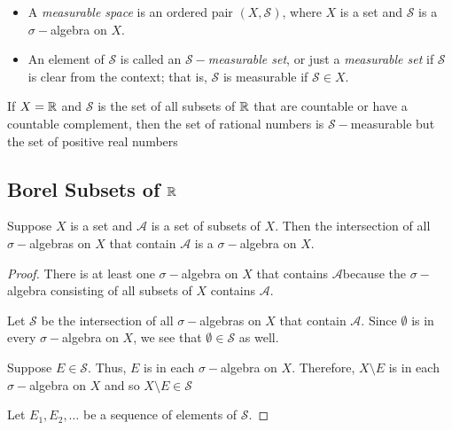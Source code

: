 \documentclass[11pt,a4paper]{book}
\begin{document}
\begin{definition}
    \begin{itemize}
        \item A \textit{measurable space} is an ordered pair \( (X, \mathcal{S}) \), where \( X  \) is a set and \( \mathcal{S} \) is a \( \sigma- \)algebra on \( X  \).
        \item An element of \( \mathcal{S} \) is called an \textit{ \( \mathcal{S}- \)measurable set}, or just a \textit{measurable set} if \( \mathcal{S} \) is clear from the context; that is, \( \mathcal{S}  \) is measurable if \( \mathcal{S} \in X   \).
    \end{itemize}
\end{definition}

\begin{eg}
  If \( X = \mathbb{R}  \) and \( \mathcal{S} \) is the set of all subsets of \( \mathbb{R}  \) that are countable or have a countable complement, then the set of rational numbers is \( \mathcal{S}- \)measurable but the set of positive real numbers 
\end{eg}

\subsection{Borel Subsets of \( \mathbb{R}  \)}

\begin{prop}
   Suppose \( X  \) is a set and \( \mathcal{A} \) is a set of subsets of \( X  \). Then the intersection of all \( \sigma- \)algebras on \( X  \) that contain \( \mathcal{A} \) is a \( \sigma- \)algebra on \( X  \). 
\end{prop}

\begin{proof}
    There is at least one \( \sigma- \)algebra on \( X  \) that contains \( \mathcal{A} \)because the \( \sigma- \)algebra consisting of all subsets of \( X  \) contains \( \mathcal{A} \). 

    Let \( \mathcal{S} \) be the intersection of all \( \sigma- \)algebras on \( X  \) that contain \( \mathcal{A} \). Since \( \emptyset  \) is in every \( \sigma- \)algebra on \( X  \), we see that \( \emptyset \in \mathcal{S} \) as well.

    Suppose \( E \in \mathcal{S} \). Thus, \( E  \) is in each \( \sigma- \)algebra on \( X  \). Therefore, \( X \setminus  E  \) is in each \( \sigma- \)algebra on \( X  \) and so \( X \setminus  E \in \mathcal{S} \)

    Let \( {E}_{1}, {E}_{2}, \dots  \) be a sequence of elements of \( \mathcal{S} \). 
\end{proof}
\end{document}
